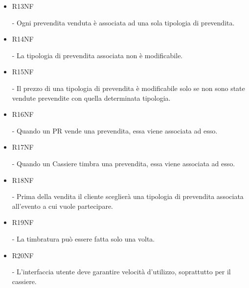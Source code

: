 \documentclass[a4paper]{article}
\begin{document}
\begin{itemize}
	\item \hypertarget{R13NF}{R13NF} - Ogni prevendita venduta è associata ad una sola tipologia di prevendita.
	\item \hypertarget{R14NF}{R14NF} - La tipologia di prevendita associata non è modificabile.
	
	\item \hypertarget{R15NF}{R15NF} - Il prezzo di una tipologia di prevendita è modificabile solo se non sono state vendute prevendite con quella determinata tipologia.
	
	\item \hypertarget{R16NF}{R16NF} - Quando un PR vende una prevendita, essa viene associata ad esso.
	\item \hypertarget{R17NF}{R17NF} - Quando un Cassiere timbra una prevendita, essa viene associata ad esso.
	
	\item \hypertarget{R18NF}{R18NF} - Prima della vendita il cliente sceglierà una tipologia di prevendita associata all'evento a cui vuole partecipare.
	
	\item \hypertarget{R19NF}{R19NF} - La timbratura può essere fatta solo una volta.
	
	\item \hypertarget{R20NF}{R20NF} - L'interfaccia utente deve garantire velocità d'utilizzo, soprattutto per il cassiere.
	
	
	
	
	

\end{itemize}
\end{document}
